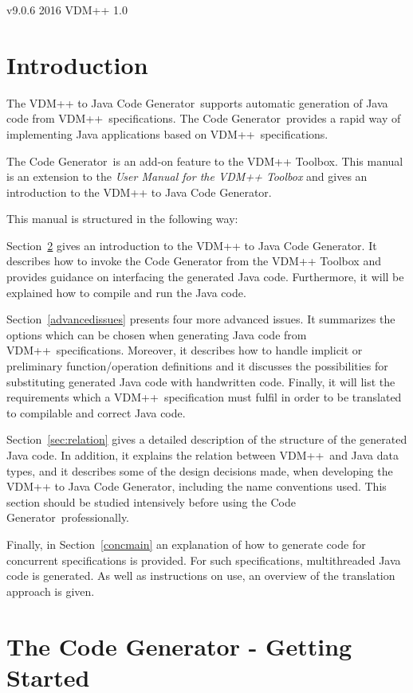 \documentclass[\pformat,11pt]{article}
\newcommand{\ToolboxName}{VDM++ Toolbox}
\newcommand{\tcg}{the Code Generator}
\newcommand{\Tcg}{The Code Generator}
\newcommand{\VDM}{VDM++}
\newcommand{\cg}{VDM++ to Java Code Generator}
\begin{document}
       {v9.0.6}
       {2016}
       {VDM++}
       {1.0}

\section{Introduction}

The \cg\ supports automatic generation of Java code from \VDM\ 
specifications. \Tcg\ provides a rapid way of 
implementing Java applications based on \VDM\ specifications.

\Tcg\ is an add-on feature to the \ToolboxName{}. This manual
is an extension to the {\em User Manual for the \VDM{} Toolbox}
\cite{UserManPP-CSK} and gives an introduction to the \cg{}. 

This manual is structured in the following way:

Section~\ref{invoking} gives an introduction to the \cg{}. It
describes how to invoke the Code Generator from the \ToolboxName{} and
provides guidance on interfacing the generated Java
code. Furthermore, it will be explained how to compile and run the
Java code. 

Section~\ref{advancedissues} presents four more advanced issues. It
summarizes the options which can be chosen when generating Java code
from \VDM\ specifications. Moreover, it describes how to handle
implicit or preliminary function/operation definitions and it
discusses the possibilities for substituting generated Java code with
handwritten code. Finally, it will list the requirements which a \VDM\
specification must fulfil in order to be translated to compilable and
correct Java code. 

Section~\ref{sec:relation} gives a detailed description of the
structure of the generated Java code. In addition, it explains the
relation between \VDM\ and Java data types, and it describes some of
the design decisions made, when developing the \cg{}, including the
name conventions used. This section should be studied intensively
before using \tcg\ professionally.

Finally, in Section~\ref{concmain} an explanation of how to generate
code for concurrent specifications is provided. For such
specifications, multithreaded Java code is generated. As well
as instructions on use, an overview of the translation approach is  given. 
\newpage

\section{The Code Generator - Getting Started}\label{invoking}
\end{document}
